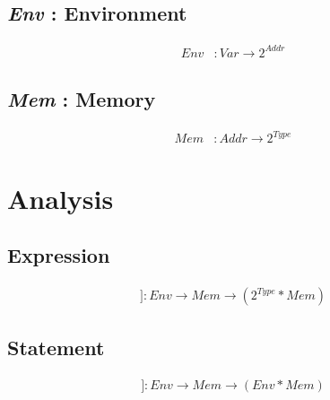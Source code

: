 \documentclass[10pt]{article}
\newcommand{\sem}[1]{[\![#1]\!]}
\begin{document}
\subsection{\textit{Env} : Environment}
\begin{align*}
  \mathit{Env} & : \mathit{Var} \to 2^{\mathit{Addr}}
\end{align*}
\subsection{\textit{Mem} : Memory}
\begin{align*}
  \mathit{Mem} & : \mathit{Addr} \to 2^{\mathit{Type}}
\end{align*}

\section{Analysis}
\subsection{Expression}
\begin{align*}
  \sem{exp} : \mathit{Env} \to \mathit{Mem} \to (2^{\mathit{Type}} *
  \mathit{Mem})
\end{align*}

\subsection{Statement}
\begin{align*}
  \sem{stat} : \mathit{Env} \to \mathit{Mem} \to (\mathit{Env} * \mathit{Mem})
\end{align*}
\end{document}

